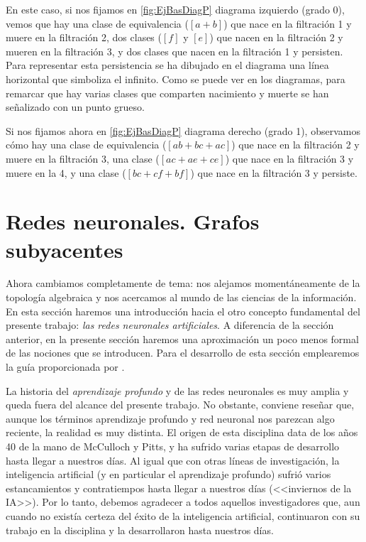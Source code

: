 \documentclass[12pt, a4paper, twoside]{book}
\numberwithin{equation}{section}
\theoremstyle{definition}
\newenvironment{ejem}
  {\pushQED{\qed}\renewcommand{\qedsymbol}{$\blacktriangleleft$}\ejemplo}
  {\popQED\endejemplo}
\theoremstyle{remark}
\theoremstyle{plain}
\begin{document}
\begin{ejem}
	En este caso, si nos fijamos en \autoref{fig:EjBasDiagP} 
	diagrama izquierdo (grado 0), vemos
	que hay una clase de equivalencia ($[a+b]$) que nace en la 
	filtración 1 y muere en la filtración 2, dos clases ($[f]$ y $[e]$) 
	que 
	nacen en la filtración 2 y mueren en la filtración 3, y dos clases que
	nacen en la filtración 1 y persisten. Para representar esta 
	persistencia se ha dibujado en el diagrama una línea horizontal que 
	simboliza el infinito. Como se puede ver en los diagramas, para 
	remarcar que hay varias clases que comparten nacimiento y muerte se 
	han señalizado con un punto grueso.

	Si nos fijamos ahora en \autoref{fig:EjBasDiagP} diagrama 
	derecho (grado 1), observamos cómo
	hay una clase de equivalencia ($[ab+bc+ac]$) que nace en la filtración 
	2
	y muere en la filtración 3, una clase ($[ac+ae+ce]$) que nace en la 
	filtración 3 y muere en la 4, y una clase ($[bc+cf+bf]$) que nace en 
	la 
	filtración 3 y persiste.
	\end{ejem}

	\section{Redes neuronales. Grafos subyacentes}
	
	Ahora cambiamos completamente de tema: nos alejamos momentáneamente de 
	la topología algebraica y nos acercamos al mundo 
	de las ciencias de la información. En esta sección haremos una
	introducción hacia el otro concepto fundamental del presente trabajo: 
	\emph{las redes neuronales artificiales}. A diferencia de la sección 
	anterior, en la presente sección haremos una aproximación un poco menos 
	formal de las nociones que se introducen. Para el desarrollo de esta 
	sección emplearemos la guía proporcionada por 
	\cite{Goodfellow-et-al-2016,IA-Jonathan,MDiscreta-Guti}.

	La historia del \emph{aprendizaje profundo} y de las redes neuronales 
	es muy amplia y queda fuera del alcance del presente trabajo. No 
	obstante, conviene reseñar que, aunque los términos aprendizaje 
	profundo y red neuronal nos parezcan algo reciente, la realidad es muy
	distinta. El origen de esta disciplina data de los años 40 de la mano
	de McCulloch y Pitts, y ha sufrido varias etapas de desarrollo hasta 
	llegar a nuestros días. Al igual que con otras líneas de 
	investigación, la inteligencia artificial (y en particular el 
	aprendizaje profundo) sufrió varios estancamientos y contratiempos 
	hasta llegar a nuestros días (<<inviernos de la IA>>). Por lo tanto, 
	debemos agradecer a todos aquellos investigadores que, aun cuando no 
	existía certeza del éxito de la inteligencia artificial, continuaron 
	con su trabajo en la disciplina y la desarrollaron hasta nuestros 
	días.
\end{document}
